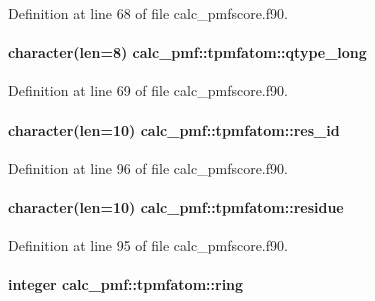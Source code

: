 Definition at line 68 of file calc\-\_\-pmfscore.\-f90.

\hypertarget{structcalc__pmf_1_1tpmfatom_af9fdcaa2eec8f9fbec5977fbd09ba113}{
\paragraph[{qtype\-\_\-long}]{\setlength{\rightskip}{0pt plus 5cm}character(len=8) calc\-\_\-pmf\-::tpmfatom\-::qtype\-\_\-long}}\label{structcalc__pmf_1_1tpmfatom_af9fdcaa2eec8f9fbec5977fbd09ba113}


Definition at line 69 of file calc\-\_\-pmfscore.\-f90.

\hypertarget{structcalc__pmf_1_1tpmfatom_a2da7425945e4de6764f45007898debd4}{
\paragraph[{res\-\_\-id}]{\setlength{\rightskip}{0pt plus 5cm}character(len=10) calc\-\_\-pmf\-::tpmfatom\-::res\-\_\-id}}\label{structcalc__pmf_1_1tpmfatom_a2da7425945e4de6764f45007898debd4}


Definition at line 96 of file calc\-\_\-pmfscore.\-f90.

\hypertarget{structcalc__pmf_1_1tpmfatom_a9c411416e0292451c2f1f054e9c2fc11}{
\paragraph[{residue}]{\setlength{\rightskip}{0pt plus 5cm}character(len=10) calc\-\_\-pmf\-::tpmfatom\-::residue}}\label{structcalc__pmf_1_1tpmfatom_a9c411416e0292451c2f1f054e9c2fc11}


Definition at line 95 of file calc\-\_\-pmfscore.\-f90.

\hypertarget{structcalc__pmf_1_1tpmfatom_ae7241d0213360f638bbf55e20ed3cb49}{
\paragraph[{ring}]{\setlength{\rightskip}{0pt plus 5cm}integer calc\-\_\-pmf\-::tpmfatom\-::ring}}\label{structcalc__pmf_1_1tpmfatom_ae7241d0213360f638bbf55e20ed3cb49}



